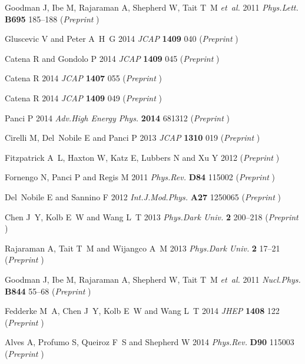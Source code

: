 \documentclass[11pt,a4paper]{article}
\begin{document}
\begin{thebibliography}{10}
Goodman J, Ibe M, Rajaraman A, Shepherd W, Tait T~M {\em et~al.\/} 2011 {\em
  Phys.Lett.\/} {\bf B695} 185--188 (\textit{Preprint} )

Gluscevic V and Peter A~H~G 2014 {\em JCAP\/} {\bf 1409} 040 (\textit{Preprint}
  )

Catena R and Gondolo P 2014 {\em JCAP\/} {\bf 1409} 045 (\textit{Preprint}
  )

Catena R 2014 {\em JCAP\/} {\bf 1407} 055 (\textit{Preprint}
  )

Catena R 2014 {\em JCAP\/} {\bf 1409} 049 (\textit{Preprint}
  )

Panci P 2014 {\em Adv.High Energy Phys.\/} {\bf 2014} 681312 (\textit{Preprint}
  )

Cirelli M, Del~Nobile E and Panci P 2013 {\em JCAP\/} {\bf 1310} 019
  (\textit{Preprint} )

Fitzpatrick A~L, Haxton W, Katz E, Lubbers N and Xu Y 2012  (\textit{Preprint}
  )

Fornengo N, Panci P and Regis M 2011 {\em Phys.Rev.\/} {\bf D84} 115002
  (\textit{Preprint} )

Del~Nobile E and Sannino F 2012 {\em Int.J.Mod.Phys.\/} {\bf A27} 1250065
  (\textit{Preprint} )

Chen J~Y, Kolb E~W and Wang L~T 2013 {\em Phys.Dark Univ.\/} {\bf 2} 200--218
  (\textit{Preprint} )

Rajaraman A, Tait T~M and Wijangco A~M 2013 {\em Phys.Dark Univ.\/} {\bf 2}
  17--21 (\textit{Preprint} )

Goodman J, Ibe M, Rajaraman A, Shepherd W, Tait T~M {\em et~al.\/} 2011 {\em
  Nucl.Phys.\/} {\bf B844} 55--68 (\textit{Preprint} )

Fedderke M~A, Chen J~Y, Kolb E~W and Wang L~T 2014 {\em JHEP\/} {\bf 1408} 122
  (\textit{Preprint} )

Alves A, Profumo S, Queiroz F~S and Shepherd W 2014 {\em Phys.Rev.\/} {\bf D90}
  115003 (\textit{Preprint} )
  

\end{thebibliography}
\end{document}
